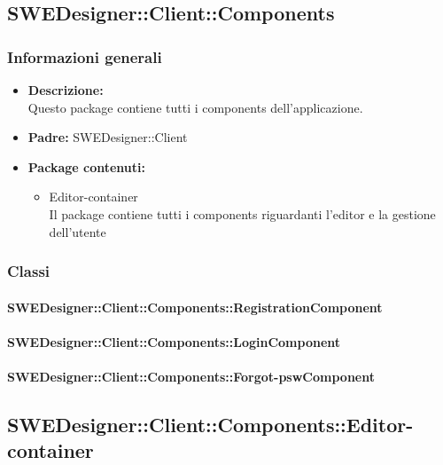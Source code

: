 	\subsection{SWEDesigner::Client::Components}
		\subsubsection{Informazioni generali}
			\begin{itemize}
          		\item \textbf{Descrizione:}\\
          		Questo package contiene tutti i components dell’applicazione.
          		\item \textbf{Padre:} SWEDesigner::Client
          		\item \textbf{Package contenuti:}\\
          		\begin{itemize}
          			\item Editor-container\\
          			Il package contiene tutti i components riguardanti l'editor e la gestione dell'utente
          		\end{itemize}
          	\end{itemize}
          	
		\subsubsection{Classi}
		
			\paragraph{SWEDesigner::Client::Components::RegistrationComponent}
				
				
			\paragraph{SWEDesigner::Client::Components::LoginComponent}
				
				
			\paragraph{SWEDesigner::Client::Components::Forgot-pswComponent}
				
				
	\subsection{SWEDesigner::Client::Components::Editor-container}
